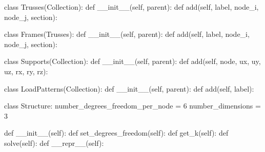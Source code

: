 \begin{codigoprog}
class Trusses(Collection):
    def __init__(self, parent):
    def add(self, label, node_i, node_j, section):
\end{codigoprog}

\begin{codigoprog}
class Frames(Trusses):
    def __init__(self, parent):
    def add(self, label, node_i, node_j, section):
\end{codigoprog}

\begin{codigoprog}
class Supports(Collection):
    def __init__(self, parent):
    def add(self, node, ux, uy, uz, rx, ry, rz):
\end{codigoprog}

\begin{codigoprog}
class LoadPatterns(Collection):
    def __init__(self, parent):
    def add(self, label):
\end{codigoprog}

\begin{codigoprog}
class Structure:
    number_degrees_freedom_per_node = 6
    number_dimensions = 3

    def __init__(self):
    def set_degrees_freedom(self):
    def get_k(self):
    def solve(self):
    def __repr__(self):
\end{codigoprog}








